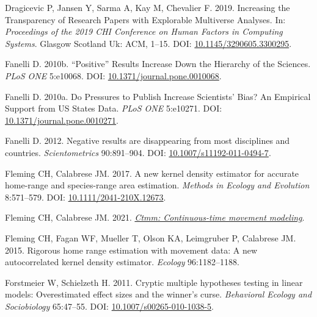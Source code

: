 \documentclass[10pt,a4paper]{article}
\newlength{\cslhangindent}
\newlength{\cslentryspacingunit} %
\newenvironment{CSLReferences}[2] %
 {%
  \setlength{\parindent}{0pt}
  \ifodd #1
  \let\oldpar\par
  \def\par{\hangindent=\cslhangindent\oldpar}
  \fi
  \setlength{\parskip}{#2\cslentryspacingunit}
 }%
 {}
\begin{document}
\begin{CSLReferences}{1}{0}
\leavevmode{}%
Dragicevic P, Jansen Y, Sarma A, Kay M, Chevalier F. 2019. Increasing the {Transparency} of {Research} {Papers} with {Explorable} {Multiverse} {Analyses}. In: \emph{Proceedings of the 2019 {CHI} {Conference} on {Human} {Factors} in {Computing} {Systems}}. Glasgow Scotland Uk: ACM, 1--15. DOI: \href{https://doi.org/10.1145/3290605.3300295}{10.1145/3290605.3300295}.

\leavevmode{}%
Fanelli D. 2010b. {``{Positive}''} {Results} {Increase} {Down} the {Hierarchy} of the {Sciences}. \emph{PLoS ONE} 5:e10068. DOI: \href{https://doi.org/10.1371/journal.pone.0010068}{10.1371/journal.pone.0010068}.

\leavevmode{}%
Fanelli D. 2010a. Do {Pressures} to {Publish} {Increase} {Scientists}' {Bias}? {An} {Empirical} {Support} from {US} {States} {Data}. \emph{PLoS ONE} 5:e10271. DOI: \href{https://doi.org/10.1371/journal.pone.0010271}{10.1371/journal.pone.0010271}.

\leavevmode{}%
Fanelli D. 2012. Negative results are disappearing from most disciplines and countries. \emph{Scientometrics} 90:891--904. DOI: \href{https://doi.org/10.1007/s11192-011-0494-7}{10.1007/s11192-011-0494-7}.

\leavevmode{}%
Fleming CH, Calabrese JM. 2017. A new kernel density estimator for accurate home-range and species-range area estimation. \emph{Methods in Ecology and Evolution} 8:571--579. DOI: \href{https://doi.org/10.1111/2041-210X.12673}{10.1111/2041-210X.12673}.

\leavevmode{}%
Fleming CH, Calabrese JM. 2021. \emph{\href{https://CRAN.R-project.org/package=ctmm}{Ctmm: Continuous-time movement modeling}}.

\leavevmode{}%
Fleming CH, Fagan WF, Mueller T, Olson KA, Leimgruber P, Calabrese JM. 2015. Rigorous home range estimation with movement data: {A} new autocorrelated kernel density estimator. \emph{Ecology} 96:1182--1188.

\leavevmode{}%
Forstmeier W, Schielzeth H. 2011. Cryptic multiple hypotheses testing in linear models: Overestimated effect sizes and the winner's curse. \emph{Behavioral Ecology and Sociobiology} 65:47--55. DOI: \href{https://doi.org/10.1007/s00265-010-1038-5}{10.1007/s00265-010-1038-5}.


\end{CSLReferences}
\end{document}
